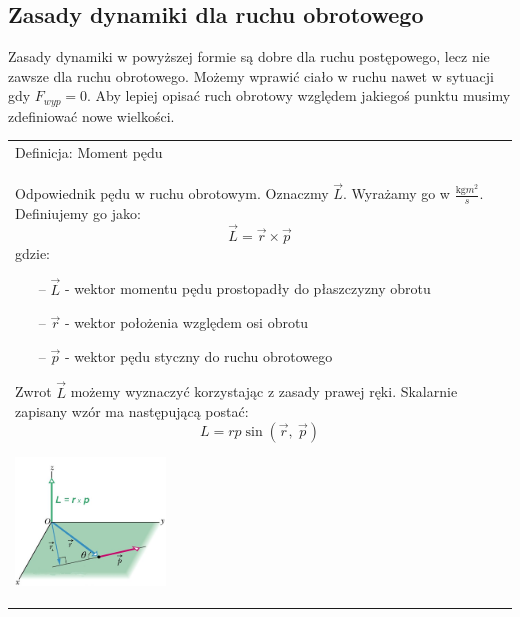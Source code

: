 \documentclass[a4paper]{article}
\newenvironment{definition}[2][Definicja]
    {
        \begin{center}
        \begin{tabular}{|p{1\textwidth}|}
        \hline
            #1: #2\\[2ex]
        \begin{em}
        \Large
    }
    { 
        \end{em}
        \\\hline
        \end{tabular} 
        \end{center}
    }
\begin{document}
    \subsection{\LARGE Zasady dynamiki dla ruchu obrotowego}
    Zasady dynamiki w powyższej formie są dobre dla ruchu postępowego, lecz nie zawsze dla
    ruchu obrotowego. Możemy wprawić ciało w ruchu nawet w sytuacji gdy $F_{wyp} = 0$.
    Aby lepiej opisać ruch obrotowy względem jakiegoś punktu musimy zdefiniować
    nowe wielkości.
    \begin{definition}{Moment pędu}
        Odpowiednik pędu w ruchu obrotowym. Oznaczmy $\vec{L}$. Wyrażamy go w $\frac{\text{kg}m^2}{s}$. Definiujemy go jako:
        \[\vec{L} = \vec{r} \times \vec{p}\]
        gdzie:
        \begin{itemize}
            \item[--] $\vec{L}$ - wektor momentu pędu prostopadły do płaszczyzny obrotu
            \item[--] $\vec{r}$ - wektor położenia względem osi obrotu
            \item[--] $\vec{p}$ - wektor pędu styczny do ruchu obrotowego 
        \end{itemize}
        Zwrot $\vec{L}$ możemy wyznaczyć korzystając z zasady prawej ręki. Skalarnie zapisany wzór
        ma następującą postać:
        \[L = rp\sin(\vec{r},\ \vec{p})\]
        \begin{center}
            \includegraphics[width=4cm]{img/momentsily.png}
        \end{center}   
    \end{definition}
\end{document}
